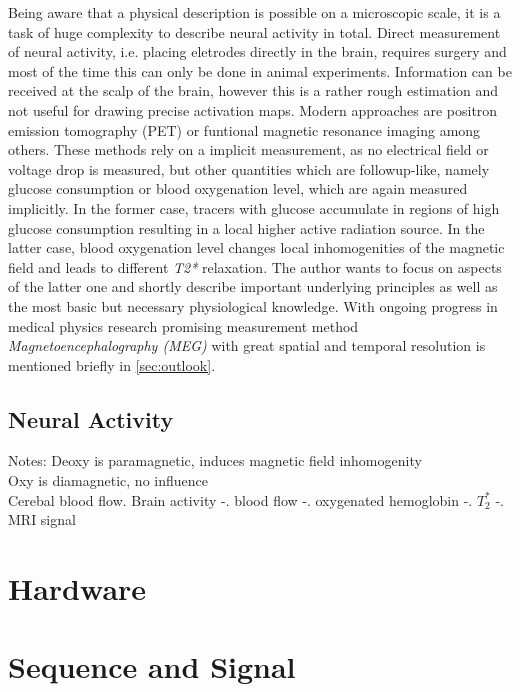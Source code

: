 Being aware that a physical description is possible on a microscopic scale, it is a task of huge complexity to describe neural activity in total.
Direct measurement of neural activity, i.e. placing eletrodes directly in the brain, requires surgery and most of the time this can only be done in animal experiments. 
Information can be received at the scalp of the brain, however this is a rather rough estimation and not useful for drawing precise activation maps.\cite[6]{buxton}
Modern approaches are positron emission tomography (PET) or funtional magnetic resonance imaging among others.
These methods rely on a implicit measurement, as no electrical field or voltage drop is measured, but other quantities which are followup-like, namely glucose consumption or blood oxygenation level, which are again measured implicitly.
In the former case, tracers with glucose accumulate in regions of high glucose consumption resulting in a local higher active radiation source.
In the latter case, blood oxygenation level changes local inhomogenities of the magnetic field and leads to different \textit{T2*} relaxation.
The author wants to focus on aspects of the latter one and shortly describe important underlying principles as well as the most basic but necessary physiological knowledge.
With ongoing progress in medical physics research promising measurement method \textit{Magnetoencephalography (MEG)} with great spatial and temporal resolution is mentioned briefly in \ref{sec:outlook}. 

\subsection{Neural Activity}





Notes:
Deoxy is paramagnetic, induces magnetic field inhomogenity \\
Oxy is diamagnetic, no influence \\
Cerebal blood flow. Brain activity -. blood flow -. oxygenated hemoglobin -. $T_2^*$ -. MRI signal

\section{Hardware}
\label{sec:hardware}

\section{Sequence and Signal}
\label{sec:sequenceSignal}

